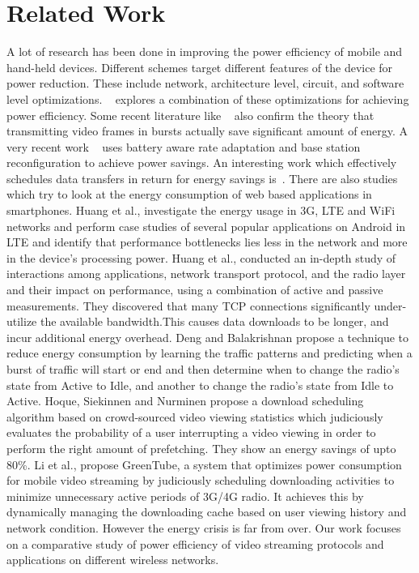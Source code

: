 \section{Related Work}
A lot of research has been done in improving the power efficiency of mobile and hand-held devices. Different schemes target different features of the device for power reduction. These include network, architecture level, circuit, and software level optimizations. ~\cite{mohapatra_mm03} explores a combination of these optimizations for achieving power efficiency. Some recent literature like ~\cite{mobiarch,movid} also confirm the theory that transmitting video frames in bursts actually save significant amount of energy. A very recent work ~\cite{ucsd_wcnc} uses battery aware rate adaptation and base station reconfiguration to achieve power savings. An interesting work which effectively schedules data transfers in return for energy savings is~\cite{balasubramanian_imc09}. There are also studies which try to look at the energy consumption of web based applications in smartphones. Huang et al.,\cite{huang2012close} investigate the energy usage in 3G, LTE and WiFi networks and perform case studies of several popular applications on Android in LTE and identify that performance bottlenecks lies less in the network and more in the device's processing power.
Huang et al.,\cite{huang2013depth} conducted an in-depth study of interactions among applications, network transport protocol, and the radio layer and their impact on performance, using a combination of active and passive measurements. They discovered that many TCP connections significantly under-utilize the available bandwidth.This causes data downloads to be longer, and incur additional energy overhead.  
Deng and Balakrishnan\cite{deng2012traffic} propose a technique to reduce energy consumption by learning the traffic patterns and predicting when a burst of traffic will start or end and then determine when to change the radio's state from Active to Idle, and another to change the radio's state from Idle to Active.
Hoque, Siekinnen and Nurminen\cite{hoque2013using} propose a download scheduling algorithm based on crowd-sourced video viewing statistics which judiciously evaluates the probability of a user interrupting a video viewing in order to perform the right amount of prefetching. They show an energy savings of upto 80\%.
Li et al.,\cite{li2012greentube} propose GreenTube, a system that optimizes power consumption for mobile video streaming by judiciously scheduling downloading activities to minimize unnecessary active periods of 3G/4G radio. It achieves this by dynamically managing the downloading cache based on user viewing history and network condition. 
However the energy crisis is far from over. Our work focuses on a comparative study of power efficiency of video streaming protocols and applications on different wireless networks.

